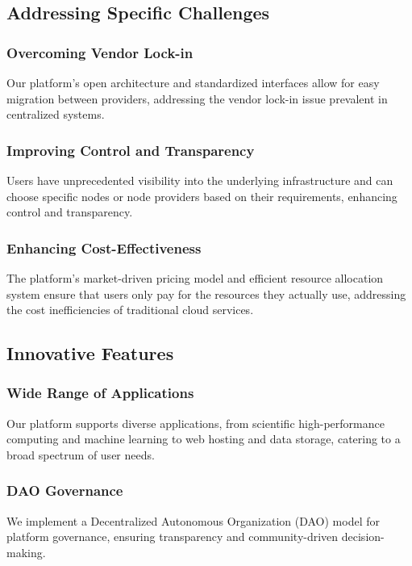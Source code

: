 \subsection{Addressing Specific Challenges}

\subsubsection{Overcoming Vendor Lock-in}
Our platform's open architecture and standardized interfaces allow for easy migration between providers, addressing the vendor lock-in issue prevalent in centralized systems.

\subsubsection{Improving Control and Transparency}
Users have unprecedented visibility into the underlying infrastructure and can choose specific nodes or node providers based on their requirements, enhancing control and transparency.

\subsubsection{Enhancing Cost-Effectiveness}
The platform's market-driven pricing model and efficient resource allocation system ensure that users only pay for the resources they actually use, addressing the cost inefficiencies of traditional cloud services.

\subsection{Innovative Features}

\subsubsection{Wide Range of Applications}
Our platform supports diverse applications, from scientific high-performance computing and machine learning to web hosting and data storage, catering to a broad spectrum of user needs.

\subsubsection{DAO Governance}
We implement a Decentralized Autonomous Organization (DAO) model for platform governance, ensuring transparency and community-driven decision-making.

